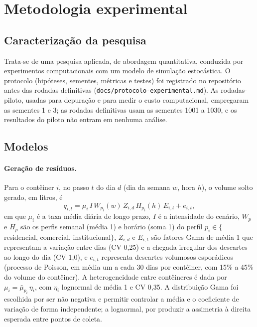 \section{Metodologia experimental}\label{sec:metodologia}

\subsection{Caracterização da pesquisa}

Trata-se de uma pesquisa aplicada, de abordagem quantitativa, conduzida por
experimentos computacionais com um modelo de simulação estocástica. O
protocolo (hipóteses, sementes, métricas e testes) foi registrado no
repositório antes das rodadas definitivas (\texttt{docs/protocolo-experimental.md}).
As rodadas-piloto, usadas para depuração e para medir o custo computacional,
empregaram as sementes 1 e 3; as rodadas definitivas usam as sementes 1001 a
1030, e os resultados do piloto não entram em nenhuma análise.

\subsection{Modelos}

\paragraph{Geração de resíduos.}
Para o contêiner $i$, no passo $t$ do dia $d$ (dia da semana $w$, hora $h$), o
volume solto gerado, em litros, é
\begin{equation}
  q_{i,t} = \mu_i \, I \, W_{p_i}(w) \, Z_{i,d} \, H_{p_i}(h) \, E_{i,t} + e_{i,t},
  \label{eq:demanda}
\end{equation}
em que $\mu_i$ é a taxa média diária de longo prazo, $I$ é a intensidade do
cenário, $W_p$ e $H_p$ são os perfis semanal (média 1) e horário (soma 1) do
perfil $p_i \in \{$residencial, comercial, institucional$\}$, $Z_{i,d}$ e
$E_{i,t}$ são fatores Gama de média 1 que representam a variação entre dias
(CV 0,25) e a chegada irregular dos descartes ao longo do dia (CV 1,0), e
$e_{i,t}$ representa descartes volumosos esporádicos (processo de Poisson, em
média um a cada 30 dias por contêiner, com 15\% a 45\% do volume do
contêiner). A heterogeneidade entre contêineres é dada por
$\mu_i = \bar\mu_{p_i}\,\eta_i$, com $\eta_i$ lognormal de média 1 e CV 0,35.
A distribuição Gama foi escolhida por ser não negativa e permitir controlar a
média e o coeficiente de variação de forma independente; a lognormal, por
produzir a assimetria à direita esperada entre pontos de coleta.

